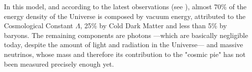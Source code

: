 In this model, and according to the latest observations (see \cite{planck_collaboration_planck_2016-1}),
almost 70\% of the energy density of the Universe is composed by vacuum energy, attributed to the Cosmological Constant
$\Lambda$, 25\% by Cold Dark Matter and less than 5\% by baryons. The remaining components are photons ---which are basically negligible today, despite the amount of light and radiation in the Universe--- and massive neutrinos,
whose mass and therefore its contribution to the "cosmic pie" has not been measured precisely enough yet.

%

